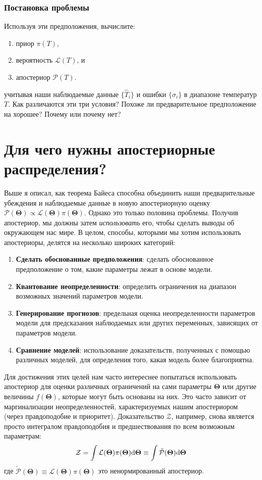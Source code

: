 \documentclass[12pt, titlepage]{article}
\newcommand{\deriv}{\ensuremath{{\rm d}}}  %
\newcommand{\params}{\ensuremath{\boldsymbol\Theta}}
\newcommand{\likelihood}{\ensuremath{\mathcal{L}}}
\newcommand{\prior}{\ensuremath{\pi}}
\newcommand{\posterior}{\ensuremath{\mathcal{P}}}
\newcommand{\evidence}{\ensuremath{\mathcal{Z}}}
\begin{document}
\subsubsection*{Постановка проблемы}

Используя эти предположения, вычислите:
\begin{enumerate}
	\item приор $\prior(T)$,
	\item вероятность $\likelihood(T)$, и
	\item апостериор $\posterior(T)$.
\end{enumerate}
учитывая наши наблюдаемые данные $\{ \hat{T}_i \}$ и ошибки $\{ \sigma_i \}$
в диапазоне температур $T$. Как различаются эти три условия?
Похоже ли предварительное предположение на хорошее? Почему или почему нет?

\section{Для чего нужны апостериорные распределения?} \label{sec:what}

Выше я описал, как теорема Байеса способна объединить наши предварительные убеждения и наблюдаемые данные в новую апостериорную оценку $\posterior(\params)\propto \likelihood(\params)\prior(\params)$. Однако это только половина проблемы. Получив апостериор, мы должны затем \textit{использовать} его, чтобы сделать выводы об окружающем нас мире. В целом, способы, которыми мы хотим использовать апостериоры, делятся на несколько широких категорий:
\begin{enumerate}
\item \textbf{Сделать обоснованные предположения}:
сделать обоснованное предположение о том, какие параметры лежат в основе модели.
\item \textbf{Квантование неопределенности}:
определить ограничения на диапазон возможных значений параметров модели.
\item \textbf{Генерирование прогнозов}: предельная оценка неопределенности параметров модели для предсказания наблюдаемых или других переменных, зависящих от параметров модели.
\item \textbf{Сравнение моделей}:
использование доказательств, полученных с помощью различных моделей, для определения того, какая модель более благоприятна.
\end{enumerate}

Для достижения этих целей нам часто интереснее попытаться использовать апостериор для оценки различных ограничений на сами параметры $\params$ или другие величины $f(\params)$, которые могут быть основаны на них. Это часто зависит от маргинализации неопределенностей, характеризуемых нашим апостериором (через правдоподобие и приоритет). Доказательство $\evidence$, например, снова является просто интегралом правдоподобия и предшествования по всем возможным параметрам:
\begin{equation}
    \evidence 
    = \int \likelihood(\params) \prior(\params) \deriv \params
    \equiv \int \tilde{\posterior}(\params) \deriv \params
\end{equation}
где $\tilde{\posterior}(\params) \equiv \likelihood(\params) \prior(\params)$
это ненормированный апостериор.
\end{document}
